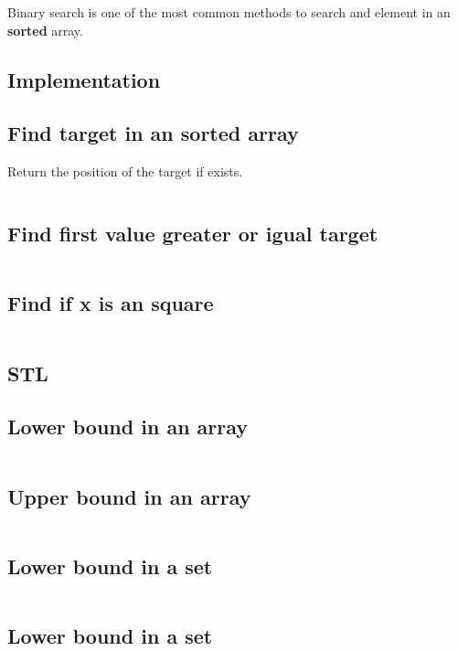 Binary search is one of the most common methods to search and element in an \textbf{sorted} array.

\subsection{Implementation}
    \subsection{Find target in an sorted array}
        Return the position of the target if exists.
        \inputminted{cpp}{BinarySearch/Code/findTarget.cpp}
        
    \subsection{Find first value greater or igual target}
        \inputminted{cpp}{BinarySearch/Code/firstValueGEx.cpp}

    \subsection{Find if x is an square}
        \inputminted{cpp}{BinarySearch/Code/xSquare.cpp}

\subsection{STL}
	\subsection{Lower bound in an array}
        \inputminted{cpp}{BinarySearch/Code/firstValueGEx.cpp}

	\subsection{Upper bound in an array}
        \inputminted{cpp}{BinarySearch/Code/firstValueGEx.cpp}
	
	\subsection{Lower bound in a set}
        \inputminted{cpp}{BinarySearch/Code/firstValueGEx.cpp}

    \subsection{Lower bound in a set}
        \inputminted{cpp}{BinarySearch/Code/firstValueGEx.cpp}